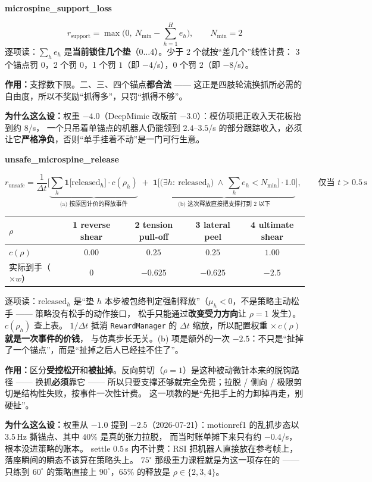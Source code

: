 \documentclass[11pt]{article}
\newcommand{\term}[1]{\texttt{\small #1}}
\newcommand{\rterm}[2]{%
  \Needspace*{7\baselineskip}\vspace{7pt}\noindent
  {\bfseries\ttfamily #1}\quad{\color{gray}\bfseries $w=#2$}\par\vspace{-3pt}}
\newcommand{\role}[1]{\noindent\textbf{作用：}#1\par}
\newcommand{\why}[1]{\noindent\textbf{为什么这么设：}#1\par}
\begin{document}
\rterm{microspine\_support\_loss}{-4.0}
\[
r_{\mathrm{support}} = \max\!\Big(0,\ N_{\min} - \textstyle\sum_{h=1}^{H} e_h\Big),
\qquad N_{\min}=2
\]
逐项读：$\sum_h e_h$ 是\textbf{当前锁住几个垫}（$0\ldots4$）。少于 2 个就按“差几个”线性计费：
3 个锚点罚 $0$，2 个罚 $0$，1 个罚 $1$（即 $-4$/s），0 个罚 $2$（即 $-8$/s）。

\role{支撑数下限。二、三、四个锚点\textbf{都合法} —— 这正是四肢轮流换抓所必需的自由度，所以不奖励“抓得多”，只罚“抓得不够”。}
\why{权重 $-4.0$（DeepMimic 改版前 $-3.0$）：模仿项把正收入天花板抬到约 $8$/s，
一个只吊着单锚点的机器人仍能领到 $2.4$–$3.5$/s 的部分跟踪收入，必须让它\textbf{严格净负}，否则“单手挂着不动”是一门可行生意。}

\newpage
\rterm{unsafe\_microspine\_release}{-2.5}
\[
r_{\mathrm{unsafe}} = \frac{1}{\Delta t}\Bigg[
\underbrace{\sum_{h} \mathbf 1\big[\text{released}_h\big]\cdot c(\rho_h)}_{\text{(a) 按原因计价的释放事件}}
\;+\;
\underbrace{\mathbf 1\Big[\big(\exists h:\ \text{released}_h\big)\ \wedge\ \textstyle\sum_h e_h < N_{\min}\Big]\cdot 1.0}_{\text{(b) 这次释放直接把支撑打到 2 以下}}
\Bigg],
\qquad \text{仅当 } t>0.5\,\mathrm{s}
\]
\begin{center}
\begin{tabular}{@{}lcccc@{}}
\toprule
$\rho$ & 1 reverse shear & 2 tension pull-off & 3 lateral peel & 4 ultimate shear \\
\midrule
$c(\rho)$ & $0.00$ & $0.25$ & $0.25$ & $1.00$ \\
实际到手（$\times w$） & $0$ & $-0.625$ & $-0.625$ & $-2.5$ \\
\bottomrule
\end{tabular}
\end{center}
逐项读：$\text{released}_h$ 是“垫 $h$ 本步被包络判定强制释放”（$\mu_h<0$，不是策略主动松手 —— 策略没有松手的动作接口，
松手只能通过\textbf{改变受力方向}让 $\rho=1$ 发生）。$c(\rho_h)$ 查上表。
$1/\Delta t$ 抵消 \term{RewardManager} 的 $\Delta t$ 缩放，所以配置权重 $\times\,c(\rho)$ \textbf{就是一次事件的价钱}，
与仿真步长无关。(b) 项是额外的一次 $-2.5$：不只是“扯掉了一个锚点”，而是“扯掉之后人已经挂不住了”。

\role{区分\textbf{受控松开}和\textbf{被扯掉}。反向剪切（$\rho=1$）是这种被动微针本来的脱钩路径 —— 换抓\textbf{必须}靠它 ——
所以只要支撑还够就完全免费；拉脱 / 侧向 / 极限剪切是结构性失败，按事件一次性计费。
这一项教的是“先把手上的力卸掉再走，别硬扯”。}
\why{权重从 $-1.0$ 提到 $-2.5$（2026-07-21）：motionref1 的乱抓步态以 $3.5$\,Hz 撕锚点、其中 $40\%$ 是真的张力拉脱，
而当时账单摊下来只有约 $-0.4$/s，根本没进策略的账本。
settle $0.5$\,s 内不计费：RSI 把机器人直接放在参考帧上，落座瞬间的瞬态不该算在策略头上。
$75^\circ$ 那级重力课程就是为这一项存在的 —— 只练到 $60^\circ$ 的策略直接上 $90^\circ$，$65\%$ 的释放是 $\rho\in\{2,3,4\}$。}
\end{document}
